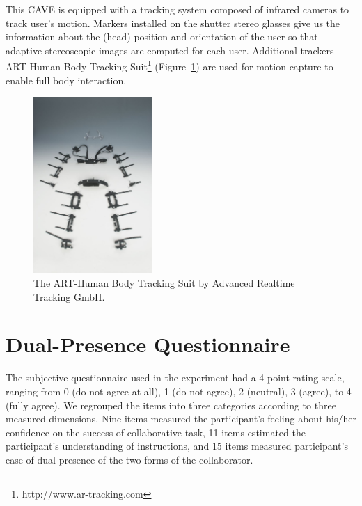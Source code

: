 \begin{appendices}
This CAVE is equipped with a tracking system composed of infrared cameras to track user's motion. Markers installed on the shutter stereo glasses give us the information about the (head) position and orientation of the user so that adaptive stereoscopic images are computed for each user. Additional trackers - ART-Human Body Tracking Suit\footnote{http://www.ar-tracking.com} (Figure~\ref{fig:mocap}) are used for motion capture to enable full body interaction.

\begin{figure}[tb]
  \centering
  \includegraphics[width=0.4\textwidth]{figures/Mocap}
  \caption{\label{fig:mocap}The ART-Human Body Tracking Suit by Advanced Realtime Tracking GmbH.}
\end{figure}

\chapter{Dual-Presence Questionnaire}
\label{appendix:dual_pres_q}
The subjective questionnaire used in the experiment had a 4-point rating scale, ranging from 0 (do not agree at all), 1 (do not agree), 2 (neutral), 3 (agree), to 4 (fully agree). We regrouped the items into three categories according to three measured dimensions. Nine items measured the participant's feeling about his/her confidence on the success of collaborative task, 11 items estimated the participant's understanding of instructions, and 15 items measured participant's ease of dual-presence of the two forms of the collaborator.


\end{appendices}
